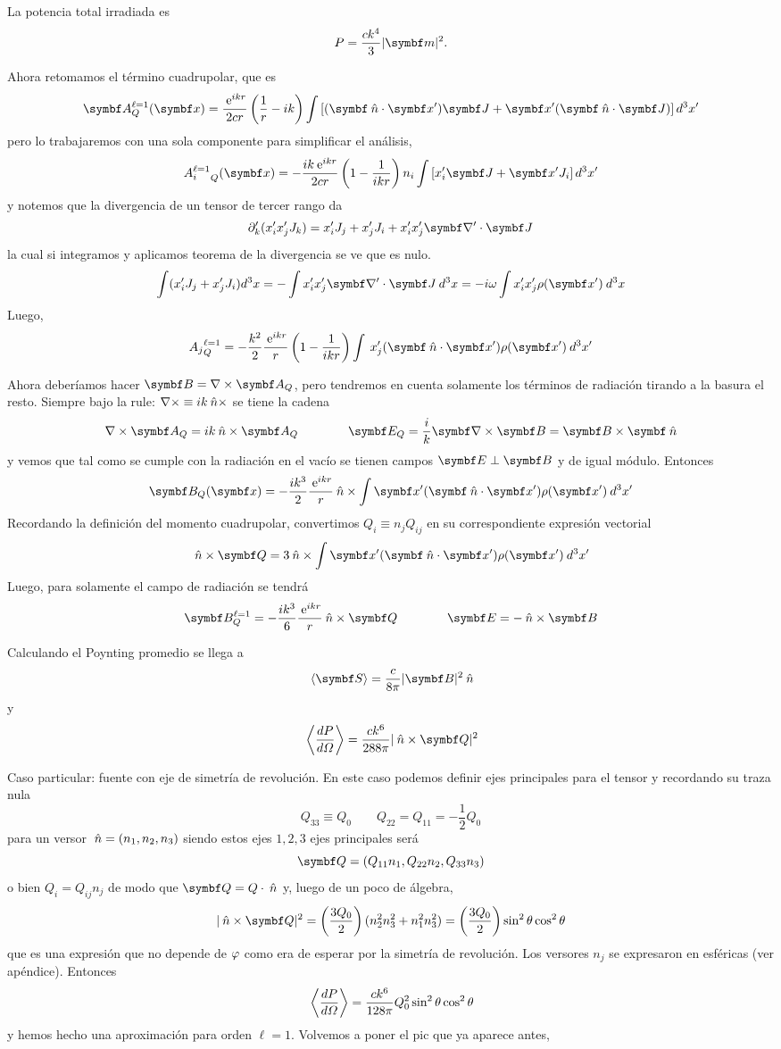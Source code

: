 \documentclass[10pt,oneside]{CBFT_book}
\begin{document}
La potencia total irradiada es
\[
	P = \frac{c k^4}{3} |\vb m|^2.
\]

Ahora retomamos el término cuadrupolar, que es
\[
	\vb{A}^{\ell=1}_Q(\vbx) = \frac{\euler^{ikr}}{2cr} \left( \frac{1}{r} -ik \right)
	\int \left[ ( \pe{\nver}{x'} ) \vb J + \vbx' ( \pe{\nver}{J} ) \right] d^3x'
\]
pero lo trabajaremos con una sola componente para simplificar el análisis,
\[
	{A^{\ell=1}_i}_Q(\vbx) = -\frac{ik\euler^{ikr}}{2cr} \left( 1 - \frac{1}{ikr} \right)
	n_i \int \left[ x_i' \vb J + \vbx' J_i \right] d^3x'
\]
y notemos que la divergencia de un tensor de tercer rango da
\[
	\partial_k'( x'_i x'_j J_k ) = x'_i J_j + x'_j J_i + x'_i x'_j \Nabla'\cdot \vb{J}
\]
la cual si integramos y aplicamos teorema de la divergencia se ve que es nulo.
\[
	\int (x'_iJ_j + x'_jJ_i) d^3x = -\int x'_i x'_j \Nabla'\cdot \vb{J} \: d^3x =
	-i\omega \int x'_i x'_j \rho(\vbx') \: d^3x
\]
Luego,
\[
	{A_j}_Q^{\ell=1} = - \frac{k^2}{2} \frac{\euler^{ikr}}{r} \left( 1 - \frac{1}{ikr} \right)
	\int \: x'_j (\pe{\nver}{x'}) \rho(\vbx') \: d^3x'
\]

Ahora deberíamos hacer $ \vb B = \nabla \times \vb{A}_Q$, pero tendremos en cuenta
solamente los términos de radiación tirando a la basura el resto. Siempre bajo la
rule: $ \nabla\times \equiv i k \:\hat{n} \times $ se tiene la cadena
\[
	\nabla \times \vb{A}_Q = i k \nver\times \vb{A}_Q \qquad \qquad 
	\vb E_Q = \frac{i}{k} \rotorm{B} = \pv{B}{\nver}
\]
y vemos que tal como se cumple con la radiación en el vacío se tienen campos $\vb E \perp \vb B$
y de igual módulo. Entonces
\[
	\vb{B}_Q(\vbx) = - \frac{ik^3}{2} \frac{\euler^{ikr}}{r} \nver \times
	\int \vbx' (\pe{\nver}{x'}) \rho(\vbx') \: d^3x'
\]
Recordando la definición del momento cuadrupolar, convertimos $Q_i \equiv n_j Q_{ij}$ en su
correspondiente expresión vectorial
\[
	\nver \times \vb{Q} = 3 \nver \times \int \vbx' (\pe{\nver}{x'}) \rho(\vbx') \: d^3x'
\]
Luego, para solamente el campo de radiación se tendrá
\[
	\vb{B}_Q^{\ell=1} = - \frac{ik^3}{6} \frac{\euler^{ikr}}{r} \nver \times \vb{Q} \qquad 
	\qquad \vb E = - \nver \times \vb B
\]

Calculando el Poynting promedio se llega a
\[
	\vm{\vb S} = \frac{c}{8\pi} |\vb B|^2 \nver 
\]
y
\[
	\vm{ \dtot{P}{\Omega} } = \frac{ck^6}{288\pi} |\nver \times \vb Q|^2
\]

Caso particular: fuente con eje de simetría de revolución. En este caso podemos definir ejes
principales para el tensor y recordando su traza nula
\[
	Q_{33} \equiv Q_0 \qquad Q_{22} = Q_{11} = - \frac{1}{2}Q_0
\]
para un versor $\:\hat{n} = (n_1, n_2, n_3)$ siendo estos ejes $1,2,3$ ejes principales será
\[
	\vb{Q} = (Q_{11}n_1, Q_{22}n_2, Q_{33}n_3)
\]
o bien $Q_i = Q_{ij}n_j$ de modo que $\vb{Q} = Q\cdot\nver$ y, luego de un poco de álgebra,
\[
	|\nver \times \vb Q|^2 = \Frac{3Q_0}{2} (n_2^2n_3^2 + n_1^2n_3^2)=
	\Frac{3Q_0}{2} \sin^2\theta \cos^2\theta
\]
que es una expresión que no depende de $\varphi$ como era de esperar por la simetría de revolución.
Los versores $n_j$ se expresaron en esféricas (ver apéndice).
Entonces
\[
	\:\left\langle  \frac{d^{\hspace{-0.05em}} {P}}{d {\Omega}^{\hspace{-0.05em}}}  \right\rangle = \frac{ck^6}{128\pi} Q_0^2 \sin^2\theta \cos^2\theta 
\]
y hemos hecho una aproximación para orden $\ell=1$. Volvemos a poner el pic que ya aparece
antes,
\end{document}
